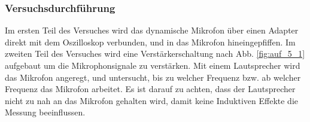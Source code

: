 \documentclass[12pt,a4paper]{article}
\begin{document}
\subsubsection*{Versuchsdurchführung}
Im ersten Teil des Versuches wird das dynamische Mikrofon über einen Adapter direkt mit dem Oszilloskop verbunden, und in das Mikrofon hineingepfiffen. Im zweiten Teil des Versuches wird eine Verstärkerschaltung nach Abb. \ref{fig:auf_5_1} aufgebaut um die Mikrophonsignale zu verstärken. Mit einem Lautsprecher wird das Mikrofon angeregt, und untersucht, bis zu welcher Frequenz bzw. ab welcher Frequenz das Mikrofon arbeitet. Es ist darauf zu achten, dass der Lautsprecher nicht zu nah an das Mikrofon gehalten wird, damit keine Induktiven Effekte die Messung beeinflussen.
\end{document}
